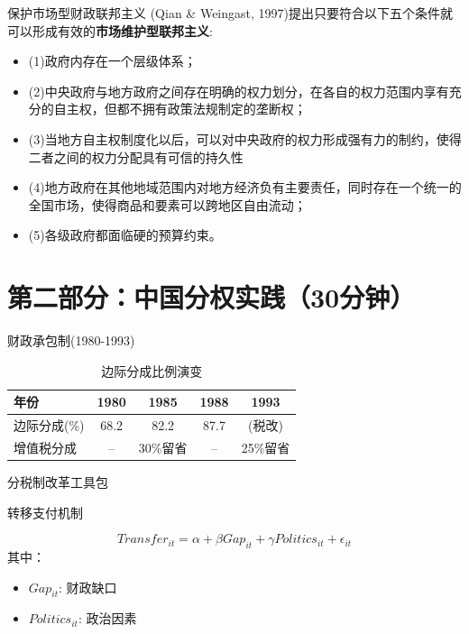\documentclass{beamer}
\begin{document}
\begin{frame}{保护市场型财政联邦主义}
\label{ux4fddux62a4ux5e02ux573aux578bux8d22ux653fux8054ux90a6ux4e3bux4e49}
(Qian \& Weingast,
1997)提出只要符合以下五个条件就可以形成有效的\textbf{市场维护型联邦主义}:

\begin{itemize}[<+->]
\item
  (1)政府内存在一个层级体系；
\item
  (2)中央政府与地方政府之间存在明确的权力划分，在各自的权力范围内享有充分的自主权，但都不拥有政策法规制定的垄断权；
\item
  (3)当地方自主权制度化以后，可以对中央政府的权力形成强有力的制约，使得二者之间的权力分配具有可信的持久性
\item
  (4)地方政府在其他地域范围内对地方经济负有主要责任，同时存在一个统一的全国市场，使得商品和要素可以跨地区自由流动；
\item
  (5)各级政府都面临硬的预算约束。
\end{itemize}
\end{frame}

\section{第二部分：中国分权实践（30分钟）}\label{ux7b2cux4e8cux90e8ux5206ux4e2dux56fdux5206ux6743ux5b9eux8df530ux5206ux949f}

\begin{frame}{财政承包制(1980-1993)}
\label{ux8d22ux653fux627fux5305ux52361980-1993}
\begin{table}[htbp]
\centering
\caption{边际分成比例演变}
\begin{tabular}{lcccc}
\toprule
年份 & 1980 & 1985 & 1988 & 1993 \\
\midrule
边际分成(\%) & 68.2 & 82.2 & 87.7 & (税改) \\
增值税分成 & -- & 30\%留省 & -- & 25\%留省 \\
\bottomrule
\end{tabular}
\end{table}
\end{frame}

\begin{frame}{分税制改革工具包}
\label{ux5206ux7a0eux5236ux6539ux9769ux5de5ux5177ux5305}
\end{frame}

\begin{frame}{转移支付机制}
\label{ux8f6cux79fbux652fux4ed8ux673aux5236}
\footnotesize

\[
Transfer_{it} = \alpha + \beta Gap_{it} + \gamma Politics_{it} + \epsilon_{it}
\] 其中：

\begin{itemize}
\item $Gap_{it}$: 财政缺口 
\item $Politics_{it}$: 政治因素
\end{itemize}
\end{frame}
\end{document}
